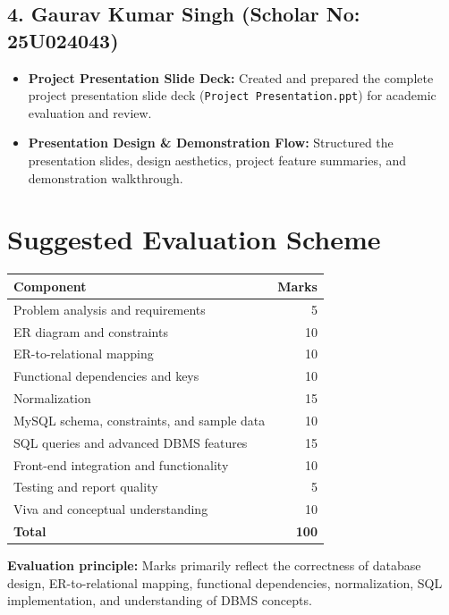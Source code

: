 \documentclass[12pt,a4paper]{report}
\DeclareRobustCommand{\_}{\textunderscore\allowbreak}
\begin{document}
\section*{4. Gaurav Kumar Singh (Scholar No: 25U024043)}
\begin{itemize}
    \item \textbf{Project Presentation Slide Deck:} Created and prepared the complete project presentation slide deck (\texttt{Project Presentation.ppt}) for academic evaluation and review.
    \item \textbf{Presentation Design \& Demonstration Flow:} Structured the presentation slides, design aesthetics, project feature summaries, and demonstration walkthrough.
\end{itemize}

\chapter*{Suggested Evaluation Scheme}

\begin{center}
\begin{tabular}{p{10cm}r}
\toprule
\textbf{Component} & \textbf{Marks} \\
\midrule
Problem analysis and requirements & 5 \\
ER diagram and constraints & 10 \\
ER-to-relational mapping & 10 \\
Functional dependencies and keys & 10 \\
Normalization & 15 \\
MySQL schema, constraints, and sample data & 10 \\
SQL queries and advanced DBMS features & 15 \\
Front-end integration and functionality & 10 \\
Testing and report quality & 5 \\
Viva and conceptual understanding & 10 \\
\midrule
\textbf{Total} & \textbf{100} \\
\bottomrule
\end{tabular}
\end{center}

\noindent\textbf{Evaluation principle:} Marks primarily reflect the correctness of database design, ER-to-relational mapping, functional dependencies, normalization, SQL implementation, and understanding of DBMS concepts.
\end{document}
